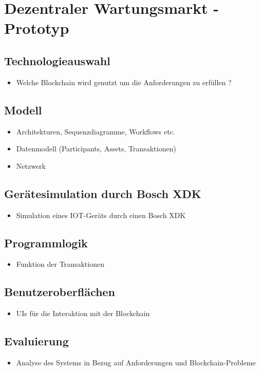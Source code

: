 \chapter{Dezentraler Wartungsmarkt - Prototyp}
\label{cha:wartungsmarkt-impl}

\section{Technologieauswahl}
\begin{itemize}
    \item Welche Blockchain wird genutzt um die Anforderungen zu erfüllen ?
\end{itemize}

\section{Modell}
\begin{itemize}
    \item Architekturen, Sequenzdiagramme, Workflows etc.
    \item Datenmodell (Participants, Assets, Transaktionen)
    \item Netzwerk
\end{itemize}

\section{Gerätesimulation durch Bosch XDK}
\begin{itemize}
    \item Simulation eines IOT-Geräts durch einen Bosch XDK
\end{itemize}

\section{Programmlogik}
\begin{itemize}
    \item Funktion der Transaktionen
\end{itemize}

\section{Benutzeroberflächen}
\begin{itemize}
    \item UIs für die Interaktion mit der Blockchain
\end{itemize}

\section{Evaluierung}
\begin{itemize}
    \item Analyse des Systems in Bezug auf Anforderungen und Blockchain-Probleme
\end{itemize}



